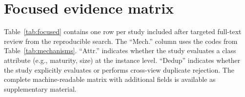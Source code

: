 \appendix

\section{Focused evidence matrix}
\label{app:focused}

Table~\ref{tab:focused} contains one row per study included after targeted full-text review from the reproducible search. The ``Mech.'' column uses the codes from Table~\ref{tab:mechanisms}. ``Attr.'' indicates whether the study evaluates a class attribute (e.g., maturity, size) at the instance level. ``Dedup'' indicates whether the study explicitly evaluates or performs cross-view duplicate rejection. The complete machine-readable matrix with additional fields is available as supplementary material.

\makeatletter
{}
\makeatother

